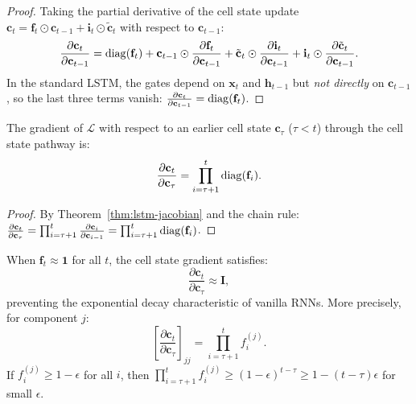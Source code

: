 \documentclass[11pt,a4paper]{article}
\begin{document}
\begin{proof}
Taking the partial derivative of the cell state update
$\mathbf{c}_t = \mathbf{f}_t \odot \mathbf{c}_{t-1} +
\mathbf{i}_t \odot \tilde{\mathbf{c}}_t$ with respect to
$\mathbf{c}_{t-1}$:
\[
  \frac{\partial \mathbf{c}_t}{\partial \mathbf{c}_{t-1}}
    = \operatorname{diag}(\mathbf{f}_t)
      + \mathbf{c}_{t-1} \odot \frac{\partial \mathbf{f}_t}
        {\partial \mathbf{c}_{t-1}}
      + \tilde{\mathbf{c}}_t \odot
        \frac{\partial \mathbf{i}_t}{\partial \mathbf{c}_{t-1}}
      + \mathbf{i}_t \odot
        \frac{\partial \tilde{\mathbf{c}}_t}
          {\partial \mathbf{c}_{t-1}}.
\]
In the standard LSTM, the gates depend on $\mathbf{x}_t$ and
$\mathbf{h}_{t-1}$ but \emph{not directly} on $\mathbf{c}_{t-1}$,
so the last three terms vanish:
$\frac{\partial \mathbf{c}_t}{\partial \mathbf{c}_{t-1}} =
\operatorname{diag}(\mathbf{f}_t)$.
\end{proof}

\begin{corollary}
\label{cor:long-range-lstm}
The gradient of $\mathcal{L}$ with respect to an earlier cell state
$\mathbf{c}_\tau$ ($\tau < t$) through the cell state pathway is:
\begin{equation}
  \frac{\partial \mathbf{c}_t}{\partial \mathbf{c}_\tau}
    = \prod_{i=\tau+1}^{t} \operatorname{diag}(\mathbf{f}_i).
  \label{eq:long-range-cell}
\end{equation}
\end{corollary}

\begin{proof}
By Theorem~\ref{thm:lstm-jacobian} and the chain rule:
$\frac{\partial \mathbf{c}_t}{\partial \mathbf{c}_\tau} =
\prod_{i=\tau+1}^{t} \frac{\partial \mathbf{c}_i}
{\partial \mathbf{c}_{i-1}} = \prod_{i=\tau+1}^{t}
\operatorname{diag}(\mathbf{f}_i)$.
\end{proof}

\begin{theorem}
\label{thm:vanishing-mitigation}
When $\mathbf{f}_t \approx \mathbf{1}$ for all $t$, the cell state
gradient satisfies:
\begin{equation}
  \frac{\partial \mathbf{c}_t}{\partial \mathbf{c}_\tau}
    \approx \mathbf{I},
  \label{eq:gradient-preservation}
\end{equation}
preventing the exponential decay characteristic of vanilla RNNs.
More precisely, for component $j$:
\[
  \left[\frac{\partial \mathbf{c}_t}{\partial \mathbf{c}_\tau}
  \right]_{jj} = \prod_{i=\tau+1}^{t} f_i^{(j)}.
\]
If $f_i^{(j)} \geq 1 - \epsilon$ for all $i$, then
$\prod_{i=\tau+1}^{t} f_i^{(j)} \geq (1-\epsilon)^{t-\tau}
\geq 1 - (t-\tau)\epsilon$ for small $\epsilon$.
\end{theorem}
\end{document}
